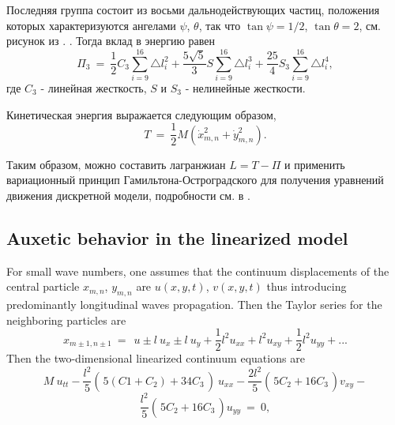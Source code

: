 Последняя группа состоит из восьми дальнодействующих частиц, положения которых характеризуются ангелами $\psi$, $\theta$, так что $\tan \psi = 1/2$, $\tan \theta=2$, см. рисунок из \cite{porkros}. . Тогда вклад в энергию равен
$$
\Pi_3~=~\frac{1}{2} C_3 \sum_{i=9}^{16}\triangle l_i^2+\frac{5\sqrt{5}}{3} S \sum_{i=9}^{16}\triangle l_i^3+\frac{25}{4} S_3 \sum_{i=9}^{16}\triangle l_i^4,
$$
где $C_3$ - линейная жесткость, $S$ и $S_3$ - нелинейные жесткости.

Кинетическая энергия выражается следующим образом,
\[
T~=~\frac{1}{2} M\left(\dot{x}_{m,n}^2+\dot{y}_{m,n}^2\right).
\]

Таким образом, можно составить лагранжиан $L = T- \Pi$ и применить вариационный принцип Гамильтона-Остроградского для получения уравнений движения дискретной модели, подробности см. в \cite{porkros}.


\subsection{Auxetic behavior in the linearized model}
For small wave numbers, one assumes that  the continuum displacements of the central particle $x_{m,n}$, $y_{m,n}$ are  $u(x, y, t)$, $v(x, y, t)$ thus introducing predominantly longitudinal waves propagation. Then the  Taylor series for the  neighboring particles are
\[
x_{m\pm1,n\pm1}~=~ ~u\pm l~ u_x\pm  l~ u_y+\frac{1}{2} l^2 u_{xx}+  l^2 u_{xy}+\frac{1}{2} l^2 u_{yy}+...
\]
Then the two-dimensional linearized continuum equations are
\[
M~u_{tt}-\frac{l^2}{5}\left(\frac{}{} 5(C1+C_2)+34 C_3 \frac{}{}\right)~u_{xx}-\frac{2l^2}{5}\left(\frac{}{}5C_2+16 C_3\frac{}{}\right) v_{xy}-
\]
\begin{equation}
	\frac{l^2}{5}\left(\frac{}{}5C_2+16 C_3\frac{}{}\right) u_{yy}~=~0,
	\label{aux1}
\end{equation}

